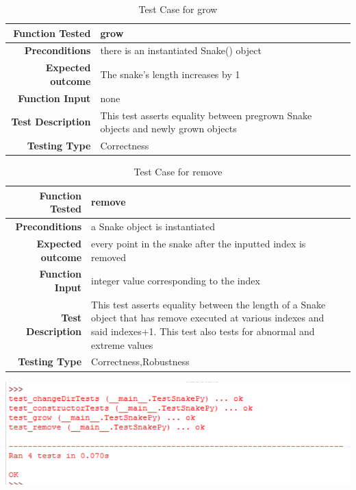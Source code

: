 \documentclass[12pt]{article}
\begin{document}
\begin{center}
	\begin{longtable}{ | r | p{4cm} | p{10cm} }
	\caption{Test Case for grow} \\ \hline \label{TblInputVar} 
	\textbf{Function Tested} & grow\\ \hline
	\textbf{Preconditions} & there is an instantiated Snake() object \\ \hline
	\textbf{Expected outcome} & The snake's length increases by 1 \\ \hline
	\textbf{Function Input} & none \\ \hline
	\textbf{Test Description} & This test asserts equality between pregrown Snake objects and newly grown objects\\ \hline
	\textbf{Testing Type} & Correctness\\ \hline
	
	\end{longtable}
\end{center}

\begin{center}
	\begin{longtable}{ | r | p{4cm} | p{10cm} }
	\caption{Test Case for remove} \\ \hline \label{TblInputVar} 
	\textbf{Function Tested} & remove\\ \hline
	\textbf{Preconditions} & a Snake object is instantiated \\ \hline
	\textbf{Expected outcome} & every point in the snake after the inputted index is removed \\ \hline
	\textbf{Function Input} & integer value corresponding to the index \\ \hline
	\textbf{Test Description} & This test asserts equality between the length of a Snake object that has remove executed at various indexes and said indexes+1. This test also tests for abnormal and extreme values\\ \hline
	\textbf{Testing Type} & Correctness,Robustness\\ \hline
	
	\end{longtable}
\includegraphics{testSnakeResults}\newline\newline
\end{center}
\end{document}
